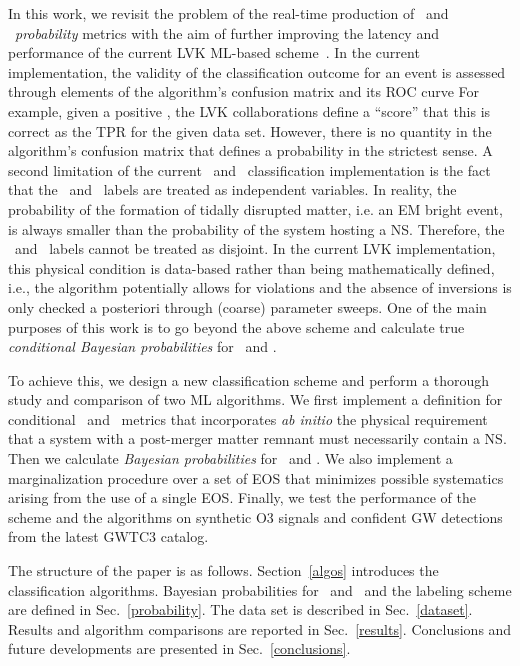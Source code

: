In this work, we revisit the problem of the real-time production of \hasns\ and \hasrem\ \emph{probability} metrics with the aim of further improving the latency and performance of the
current \ac{LVK} \ac{ML}-based scheme~\cite{Chatterjee:2019avs}. In the current implementation, the validity of the classification outcome for an event is assessed through elements of the
algorithm's confusion matrix and its \ac{ROC} curve For example, given a positive , the \ac{LVK} collaborations define a ``score'' that this 	 is correct as the
\ac{TPR} for the given data set. However, there is no quantity in the algorithm's confusion matrix that defines a probability in the strictest sense. A second limitation of the current
\hasns\ and \hasrem\ classification implementation is the fact that the \hasns\ and \hasrem\ labels are treated as independent variables. In reality, the probability of the formation of
tidally disrupted matter, i.e. an \ac{EM} bright event, is always smaller than the probability of the system hosting a \ac{NS}. Therefore, the \hasns\ and \hasrem\ labels cannot be
treated as disjoint. In the current \ac{LVK} implementation, this physical condition is data-based rather than being mathematically defined, i.e., the algorithm potentially allows for
violations and the absence of inversions is only checked a posteriori through (coarse) parameter sweeps. One of the main purposes of this work is to go beyond the above scheme and
calculate true \emph{conditional Bayesian probabilities} for \hasns\ and \hasrem. 

To achieve this, we design a new classification scheme and perform a thorough study and comparison of two \ac{ML} algorithms. We first implement a definition for conditional \hasns\ and
\hasrem\ metrics that incorporates \emph{ab initio} the physical requirement that a system with a post-merger matter remnant must necessarily contain a \ac{NS}. Then we calculate
\emph{Bayesian probabilities} for \hasns\ and \hasrem. We also implement a marginalization procedure over a set of \ac{EOS} that minimizes possible systematics arising from the use of a
single \ac{EOS}. Finally, we test the performance of the scheme and the algorithms on synthetic \ac{O3} signals and confident \ac{GW} detections from the latest \ac{GWTC3} catalog.

The structure of the paper is as follows. Section~\ref{algos} introduces the classification algorithms. Bayesian probabilities for \hasns\ and \hasrem\ and the labeling scheme are defined
in Sec.~\ref{probability}. The data set is described in Sec.~\ref{dataset}. Results and algorithm comparisons are reported in Sec.~\ref{results}. Conclusions and future developments are
presented in Sec.~\ref{conclusions}.  
